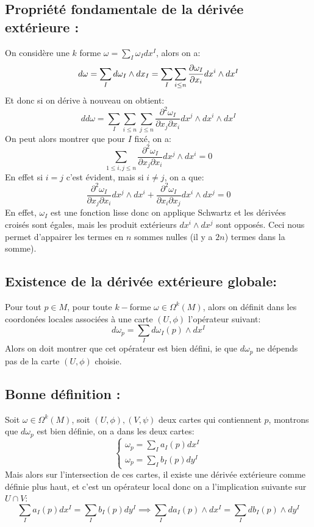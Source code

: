    \subsection*{Propriété fondamentale de la dérivée extérieure {:}}
   On considère une \( k \) forme \( \omega = \sum_I \omega_I dx^I\), alors on a:
   \[ 
      d\omega = \sum_I d\omega_I \wedge dx_I = \sum_I \sum_{i \leq n} \frac{\partial \omega_I}{\partial x_i}dx^i \wedge dx^I
   \]
   Et donc si on dérive à nouveau on obtient:
   \[ 
      dd\omega =  \sum_I \sum_{i \leq n} \sum_{j \leq n} \frac{\partial^2 \omega_I}{\partial x_j \partial x_i} dx^j \wedge dx^i \wedge dx^I
   \]
   On peut alors montrer que pour \( I \) fixé, on a:
   \[ 
      \sum_{1 \leq i, j\leq n} \frac{\partial^2 \omega_I}{\partial x_j \partial x_i} dx^j \wedge dx^i = 0
   \]
   En effet si \( i = j \) c'est évident, mais si \( i \neq j \), on a que:
   \[ 
      \frac{\partial^2 \omega_I}{\partial x_j \partial x_i} dx^j \wedge dx^i + \frac{\partial^2 \omega_I}{\partial x_i \partial x_j} dx^i \wedge dx^j = 0
   \]
   En effet, \( \omega_I \) est une fonction lisse donc on applique Schwartz et les dérivées croisés sont égales, mais les produit extérieurs \( dx^i \wedge dx^j \) sont opposés. Ceci nous permet d'appairer les termes en \( n \) sommes nulles (il y a \( 2n \)) termes dans la somme).
   \subsection*{Existence de la dérivée extérieure globale{:}}
   Pour tout \( p \in M \), pour toute \( k- \)forme \( \omega \in \Omega^k(M)\), alors on définit dans les coordonées locales associées à une carte \( (U, \phi) \) l'opérateur suivant:
   \[ 
      d\omega_p = \sum_I d\omega_I(p) \wedge dx^I
   \]
   Alors on doit montrer que cet opérateur est bien défini, ie que \( d\omega_p \) ne dépends pas de la carte \( (U, \phi) \) choisie.
   \subsection*{Bonne définition {:}}
   Soit \( \omega \in \Omega^k(M) \), soit \( (U, \phi), (V, \psi) \) deux cartes qui contiennent \( p \), montrons que \( d\omega_p \) est bien définie, on a dans les deux cartes:
   \[ 
      \begin{cases}
         \omega_p = \sum_I a_I(p)dx^I \\
         \omega_p = \sum_I b_I(p)dy^I
      \end{cases} 
   \]
   Mais alors sur l'intersection de ces cartes, il existe une dérivée extérieure comme définie plus haut, et c'est un opérateur local donc on a l'implication suivante sur \( U \cap V \):
   \[ 
      \sum_I a_I(p)dx^I = \sum_I b_I(p)dy^I \implies \sum_I da_I(p) \wedge dx^I = \sum_I db_I(p) \wedge dy^I
   \]

